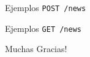 \documentclass[utf8,hyperref={colorlinks=true}]{beamer}
\begin{document}
\begin{frame}{Ejemplos}
\alert{\texttt{POST /news}}
\postsample
{}\postsampleresp
\end{frame}

\begin{frame}{Ejemplos}
\alert{\texttt{GET /news}}
\getsample
{}
\getsampleresphh
{}\getsamplerespa
{}\getsamplerespb
\end{frame}

\appendix

\begin{frame}
	\begin{center}
		{\Huge Muchas Gracias!}
	\end{center}
\end{frame}
\end{document}
